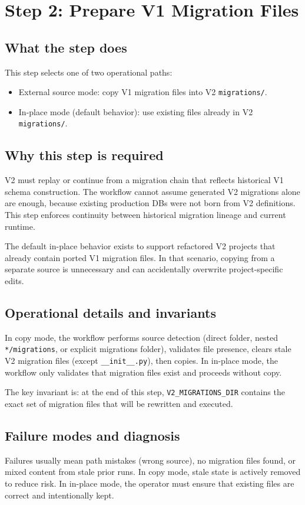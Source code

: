 \documentclass[11pt,a4paper]{article}
\begin{document}
\newpage
\section{Step 2: Prepare V1 Migration Files}
\subsection*{What the step does}
This step selects one of two operational paths:
\begin{itemize}[leftmargin=1.5em]
  \item External source mode: copy V1 migration files into V2 \texttt{migrations/}.
  \item In-place mode (default behavior): use existing files already in V2 \texttt{migrations/}.
\end{itemize}

\subsection*{Why this step is required}
V2 must replay or continue from a migration chain that reflects historical V1 schema
construction. The workflow cannot assume generated V2 migrations alone are enough, because
existing production DBs were not born from V2 definitions. This step enforces continuity
between historical migration lineage and current runtime.

The default in-place behavior exists to support refactored V2 projects that already contain
ported V1 migration files. In that scenario, copying from a separate source is unnecessary
and can accidentally overwrite project-specific edits.

\subsection*{Operational details and invariants}
In copy mode, the workflow performs source detection (direct folder, nested \texttt{*/migrations},
or explicit migrations folder), validates file presence, clears stale V2 migration files
(except \texttt{\_\_init\_\_.py}), then copies. In in-place mode, the workflow only validates
that migration files exist and proceeds without copy.

The key invariant is: at the end of this step, \texttt{V2\_MIGRATIONS\_DIR} contains the exact
set of migration files that will be rewritten and executed.

\subsection*{Failure modes and diagnosis}
Failures usually mean path mistakes (wrong source), no migration files found, or mixed
content from stale prior runs. In copy mode, stale state is actively removed to reduce risk.
In in-place mode, the operator must ensure that existing files are correct and intentionally
kept.
\end{document}
